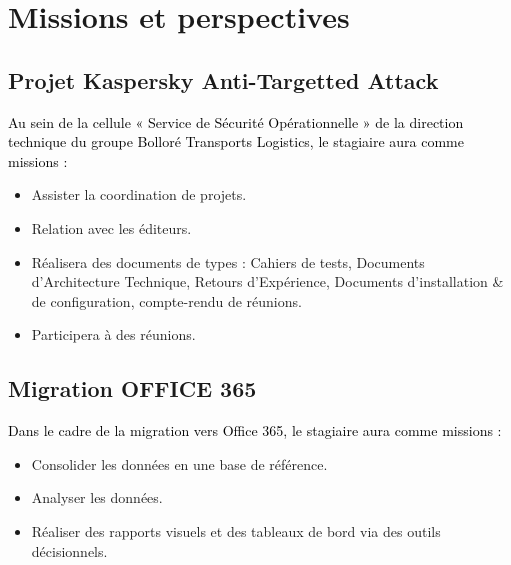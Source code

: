 \section{Missions et perspectives }
\subsection{Projet Kaspersky Anti-Targetted Attack}
\textcolor{black}{Au sein de la cellule « Service de Sécurité Opérationnelle  » de la direction technique du groupe Bolloré Transports Logistics, le stagiaire aura comme missions :}
\begin{itemize}
	\item Assister la coordination de projets.
	\item Relation avec les éditeurs.
	\item Réalisera des documents de types : Cahiers de tests, Documents d’Architecture      Technique, Retours d’Expérience, Documents d’installation & de configuration, compte-rendu de réunions.
	\item Participera à des réunions.
\end{itemize}

\subsection{Migration OFFICE 365}
\textcolor{black}{Dans le cadre de la migration vers Office 365, le stagiaire aura comme missions :}
\begin{itemize}
	\item Consolider les données en une base de référence.
	\item Analyser les données.
	\item Réaliser des rapports visuels et des tableaux de bord via des outils décisionnels.
\end{itemize}
